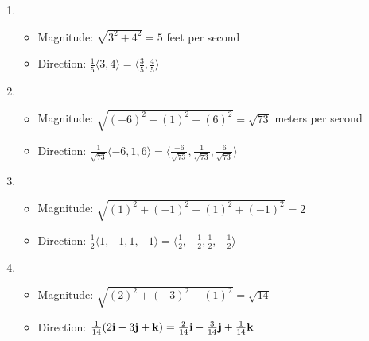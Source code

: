 \begin{enumerate}

  \item 

    \begin{itemize}

      \item Magnitude: $\sqrt{3^2 + 4^2}=5$ feet per second

      \item Direction: $\frac{1}{5}\langle 3, 4 \rangle = \langle \frac{3}{5}, \frac{4}{5} \rangle$

    \end{itemize}

    \setcounter{enumi}{2}

  \item

    \begin{itemize}

      \item Magnitude: $\sqrt{(-6)^2 + (1)^2 + (6)^2}=\sqrt{73}$ meters per second

      \item Direction: $\frac{1}{\sqrt{73}}\langle -6, 1, 6 \rangle=\langle \frac{-6}{\sqrt{73}}, \frac{1}{\sqrt{73}}, \frac{6}{\sqrt{73}}\rangle$

    \end{itemize}

    \setcounter{enumi}{4}

  \item

    \begin{itemize}

      \item Magnitude: $\sqrt{(1)^2 + (-1)^2 + (1)^2 + (-1)^2} = 2$

      \item Direction: $\frac{1}{2}\langle 1, -1, 1, -1 \rangle=\langle \frac{1}{2}, -\frac{1}{2}, \frac{1}{2}, -\frac{1}{2}\rangle$

    \end{itemize}

    \setcounter{enumi}{6}

  \item

    \begin{itemize}

      \item Magnitude: $\sqrt{(2)^2 + (-3)^2 + (1)^2}=\sqrt{14}$

      \item Direction: $\frac{1}{14}(2\bold{i}-3\bold{j}+\bold{k}) = \frac{2}{14}\bold{i} - \frac{3}{14}\bold{j} + \frac{1}{14}\bold{k}$


\end{itemize}
\end{enumerate}
